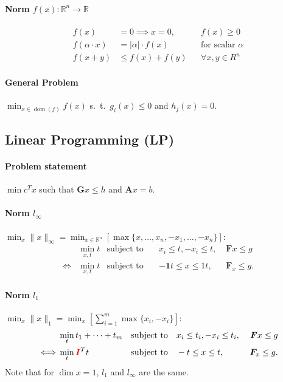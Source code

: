 \documentclass[landscape,a4paper,8pt]{scrartcl}
\newcommand{\remph}[1]{{\textcolor{red}{#1}}}
\newcommand{\R}{\mathbb R}
\newcommand\vA{\bm{A}}
\newcommand\vF{\bm{F}}
\newcommand\vG{\bm{G}}
\newcommand\vI{\bm{I}}
\DeclareMathOperator\dom{dom}
\begin{document}
\begin{multicols*}{3}
\paragraph{Norm $f(x): \R^n \rightarrow \R$}
\begin{align*}
f(x) & = 0 \implies x = 0, && f(x) \geq 0 \\
f(\alpha \cdot x) & = |\alpha|\cdot f(x) && \text{for scalar } \alpha \\
f(x+y) & \leq f(x) + f(y) && \forall x, y \in R^n
\end{align*}

\paragraph{General Problem}
$\min_{x \in \dom(f)} f(x)$ s.\ t.\ $g_i(x) \leq 0$ and $h_j(x) = 0.$

\subsection{Linear Programming (LP)}
\paragraph{Problem statement} $\min c^Tx$ such that $\vG x \leq h$ and $\vA x = b$.
\paragraph{Norm $l_\infty$}
$\min_x \lVert x \rVert_\infty = \min_{x \in \R^n} \left[ \max\{x,\dots,x_n,-x_1,\dots,-x_n\}\right]$:
\begin{align*}
     & \min_{x,t} t & \text{subject to}\quad & x_i \leq t, -x_i \leq t,   \; & \vF x \leq g \\
\iff & \min_{x,t} t & \text{subject to}\quad & -{\bm 1} t \leq x \leq 1 t,\; & \vF_x \leq g.
\end{align*}

\paragraph{Norm $l_1$}
$\min_x \lVert x \rVert_1 = \min_x\left[\sum_{i=1}^{m} \max\{x_i,-x_i\}\right]$:
\begin{align*}
     & \min_{t} t_1 + \dots + t_m & \text{subject to}\quad & x_i \leq t_i, -x_i \leq t_i,\; & \vF x \leq g \\
\iff & \min_{t} \remph{\vI}^Tt    & \text{subject to}\quad & -t \leq x \leq t,\;            & \vF_x \leq g.
\end{align*}
Note that for $\dim x = 1$, $l_1$ and $l_\infty$ are the same.


\end{multicols*}
\end{document}
